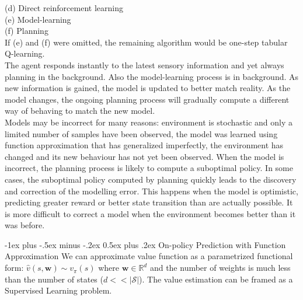 \documentclass[10pt,landscape]{article}
\makeatletter
\renewcommand{\section}{\@startsection{section}{1}{0mm}%
                                {-1ex plus -.5ex minus -.2ex}%
                                {0.5ex plus .2ex}%
                                {\normalfont\large\bfseries}}
\makeatother
\begin{document}
\begin{multicols}{3}
(d) Direct reinforcement learning\\
(e) Model-learning\\
(f) Planning\\


If (e) and (f) were omitted, the remaining algorithm would be one-step tabular Q-learning.\\

The agent responds instantly to the latest sensory information and yet always planning in the background. Also the model-learning process is in background. As new information is gained, the model is updated to better match reality. As the model changes, the ongoing planning process will gradually compute a different way of behaving to match the new model.\\

Models may be incorrect for many reasons: environment is stochastic and only a limited number of samples have been observed, the model was learned using function approximation that has generalized imperfectly, the environment has changed and its new behaviour has not yet been observed. 
When the model is incorrect, the planning process is likely to compute a suboptimal policy. In some cases, the suboptimal policy computed by planning quickly leads to the discovery and correction of the modelling error. This happens when the model is optimistic, predicting greater reward or better state transition than are actually possible. It is more difficult to correct a model when the environment becomes better than it was before.





\section{On-policy Prediction with Function Approximation}
We can approximate value function as a parametrized functional form: $\hat{v}(s,\mathbf{w}) \sim v_{\pi}(s)$ where $\mathbf{w} \in \mathbb{R}^d$ and the number of weights is much less than the number of states ($d << |\mathcal{S}|$).
The value estimation can be framed as a Supervised Learning problem.\\


\end{multicols}
\end{document}
